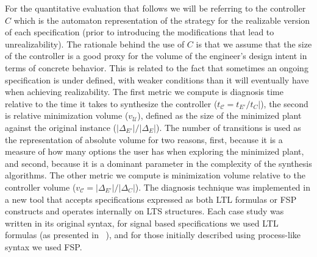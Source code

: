For the quantitative evaluation that follows we will be referring to the controller $C$ which is the automaton representation of the strategy for the realizable version of each specification (prior to introducing the modifications that lead to unrealizability). The rationale behind the use of $C$ is that we assume that the size of the controller is a good proxy for the volume of the engineer's design intent in terms of concrete behavior. This is related to the fact that sometimes an ongoing specification is under defined, with weaker conditions than it will eventually have when achieving realizability. 
The first metric we compute is diagnosis time relative to the time it takes to synthesize the controller ($t_{\mathcal{C}}=t_{E'}/t_{C}|$), the second is relative minimization volume ($v_{\mathcal{U}}$), defined as the size of the minimized plant against the original instance ($|\Delta_{E'}|/|\Delta_{E}|$). 
The number of transitions is used as the representation of absolute volume for two reasons, first, because it is a measure of how many options the user has when exploring the minimized plant, and second, because it is a dominant parameter in the complexity of the synthesis algorithms. 
The other metric we compute is minimization volume relative to the controller volume ($v_{\mathcal{C}}=|\Delta_{E'}|/|\Delta_{C}|$).
The diagnosis technique was implemented in a new tool that accepts specifications expressed as both LTL formulas or FSP constructs and operates internally on LTS structures. Each case study was written in its original syntax, for signal based specifications we used LTL formulas (as presented in ~\cite{Bloem:2012}), and for those initially described using process-like syntax we used FSP. 

